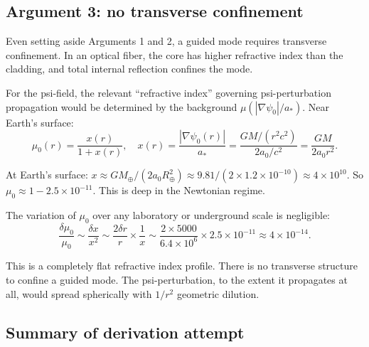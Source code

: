\documentclass[11pt]{article}
\newcommand{\ee}[1]{\times 10^{#1}}
\begin{document}
\subsection{Argument 3: no transverse confinement}

Even setting aside Arguments 1 and 2, a guided mode requires transverse
confinement. In an optical fiber, the core has higher refractive index
than the cladding, and total internal reflection confines the mode.

For the psi-field, the relevant ``refractive index'' governing
psi-perturbation propagation would be determined by the background
$\mu(|\nabla\psi_0|/a_*)$. Near Earth's surface:
\begin{equation}
\mu_0(r) = \frac{x(r)}{1 + x(r)}, \quad
x(r) = \frac{|\nabla\psi_0(r)|}{a_*} = \frac{GM/(r^2 c^2)}{2a_0/c^2}
= \frac{GM}{2a_0 r^2}.
\end{equation}

At Earth's surface: $x \approx GM_\oplus/(2a_0 R_\oplus^2) \approx
9.81/(2 \times 1.2\ee{-10}) \approx 4\ee{10}$. So $\mu_0 \approx 1 -
2.5\ee{-11}$. This is deep in the Newtonian regime.

The variation of $\mu_0$ over any laboratory or underground scale is
negligible:
\begin{equation}
\frac{\delta\mu_0}{\mu_0} \sim \frac{\delta x}{x^2} \sim \frac{2\delta r}{r}
\times \frac{1}{x} \sim \frac{2 \times 5000}{6.4\ee{6}} \times 2.5\ee{-11}
\approx 4\ee{-14}.
\end{equation}

This is a completely flat refractive index profile. There is no transverse
structure to confine a guided mode. The psi-perturbation, to the extent
it propagates at all, would spread spherically with $1/r^2$ geometric
dilution.

\subsection{Summary of derivation attempt}
\end{document}
